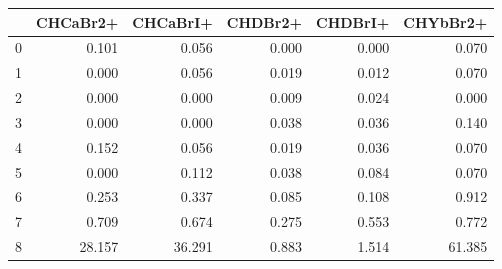 \begin{tabular}{rrrrrr}
\hline
    &   CHCaBr2+ &   CHCaBrI+ &   CHDBr2+ &   CHDBrI+ &   CHYbBr2+ \\
\hline
  0 &      0.101 &      0.056 &     0.000 &     0.000 &      0.070 \\
  1 &      0.000 &      0.056 &     0.019 &     0.012 &      0.070 \\
  2 &      0.000 &      0.000 &     0.009 &     0.024 &      0.000 \\
  3 &      0.000 &      0.000 &     0.038 &     0.036 &      0.140 \\
  4 &      0.152 &      0.056 &     0.019 &     0.036 &      0.070 \\
  5 &      0.000 &      0.112 &     0.038 &     0.084 &      0.070 \\
  6 &      0.253 &      0.337 &     0.085 &     0.108 &      0.912 \\
  7 &      0.709 &      0.674 &     0.275 &     0.553 &      0.772 \\
  8 &     28.157 &     36.291 &     0.883 &     1.514 &     61.385 \\
\hline
\end{tabular}
